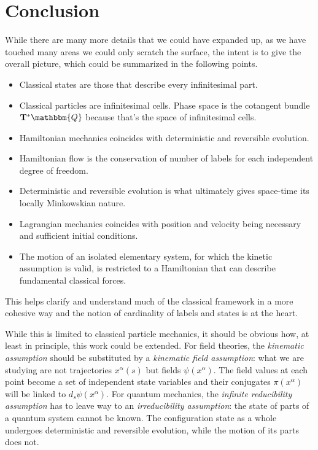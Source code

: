 \documentclass[aps,pra,10pt,twocolumn,floatfix,nofootinbib]{revtex4-1}
\theoremstyle{definition}
\begin{document}
\section{Conclusion}

While there are many more details that we could have expanded up, as we have touched many areas we could only scratch the surface, the intent is to give the overall picture, which could be summarized in the following points.

\begin{itemize}
  \item Classical states are those that describe every infinitesimal part.
  \item Classical particles are infinitesimal cells. Phase space is the cotangent bundle $\mathbf{T}^*\mathbbm{Q}$ because that's the space of infinitesimal cells.
  \item Hamiltonian mechanics coincides with deterministic and reversible evolution.
  \item Hamiltonian flow is the conservation of number of labels for each independent degree of freedom.
  \item Deterministic and reversible evolution is what ultimately gives space-time its locally Minkowskian nature.
  \item Lagrangian mechanics coincides with position and velocity being necessary and sufficient initial conditions.
  \item The motion of an isolated elementary system, for which the kinetic assumption is valid, is restricted to a Hamiltonian that can describe fundamental classical forces.
\end{itemize}

This helps clarify and understand much of the classical framework in a more cohesive way and the notion of cardinality of labels and states is at the heart.

While this is limited to classical particle mechanics, it should be obvious how, at least in principle, this work could be extended. For field theories, the \emph{kinematic assumption} should be substituted by a \emph{kinematic field assumption}: what we are studying are not trajectories $x^\alpha(s)$ but fields $\psi(x^\alpha)$. The field values at each point become a set of independent state variables and their conjugates $\pi(x^\alpha)$ will be linked to $d_s\psi(x^\alpha)$. For quantum mechanics, the \emph{infinite reducibility assumption} has to leave way to an \emph{irreducibility assumption}: the state of parts of a quantum system cannot be known. The configuration state as a whole undergoes deterministic and reversible evolution, while the motion of its parts does not.
\end{document}
